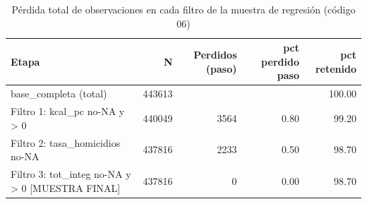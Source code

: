 \begin{table}[ht]
\centering
\caption{P\'erdida total de observaciones en cada filtro de la muestra de regresi\'on (c\'odigo 06)} 
\label{tab:12a_flowchart_perdidas_total}
\begin{tabular}{lrrrr}
  \toprule
Etapa & N & Perdidos (paso) & pct perdido paso & pct retenido \\ 
  \midrule
base\_completa (total) & 443613 &  &  & 100.00 \\ 
  Filtro 1: kcal\_pc no-NA y > 0 & 440049 & 3564 & 0.80 & 99.20 \\ 
  Filtro 2: tasa\_homicidios no-NA & 437816 & 2233 & 0.50 & 98.70 \\ 
  Filtro 3: tot\_integ no-NA y > 0 [MUESTRA FINAL] & 437816 &   0 & 0.00 & 98.70 \\ 
   \bottomrule
\end{tabular}
\end{table}
